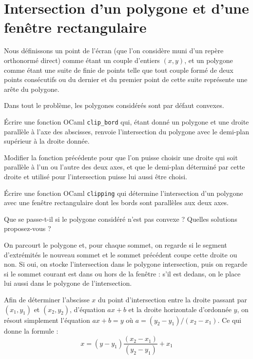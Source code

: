 \renewcommand{\SourceFile}{6-geometrie-et-images/src/6-5.ml}

\section[Intersection d'un polygone et d'une fenêtre rectangulaire]{Intersection d'un polygone et d'une\\ fenêtre rectangulaire}

Nous définissons un point de l'écran (que l'on considère muni d'un repère orthonormé direct) comme étant un couple d'entiers $(x,y)$, et un polygone comme étant une suite de finie de points telle que tout couple formé de deux points consécutifs ou du dernier et du premier point de cette suite représente une arête du polygone.
\medskip

Dans tout le problème, les polygones considérés sont par défaut convexes.

\Q
Écrire une fonction OCaml \texttt{clip\_bord} qui, étant donné un polygone et une droite parallèle à l'axe des abscisses, renvoie l'intersection du polygone avec le demi-plan supérieur à la droite donnée.

\Q
Modifier la fonction précédente pour que l'on puisse choisir une droite qui soit parallèle à l'un ou l'autre des deux axes, et que le demi-plan déterminé par cette droite et utilisé pour l'intersection puisse lui aussi être choisi.

\Q
Écrire une fonction OCaml \texttt{clipping} qui détermine l'intersection d'un polygone avec une fenêtre rectangulaire dont les bords sont parallèles aux deux axes.

\Q
Que se passe-t-il si le polygone considéré n'est pas convexe ? Quelles solutions proposez-vous ?

\Corrige

\Q
On parcourt le polygone et, pour chaque sommet, on regarde si le segment d'extrémités le nouveau sommet et le sommet précédent coupe cette droite ou non. Si oui, on stocke l'intersection dans le polygone intersection, puis on regarde si le sommet courant est dans ou hors de la fenêtre : s'il est dedans, on le place lui aussi dans le polygone de l'intersection.
\medskip

Afin de déterminer l'abscisse $x$ du point d'intersection entre la droite passant par $(x_1,y_1)$ et $(x_2,y_2)$, d'équation $ax+b$ et la droite horizontale d'ordonnée $y$, on résout simplement l'équation $ax+b=y$ où $a=(y_2-y_1)/(x_2-x_1)$. Ce qui donne la formule :
\[
    x = (y-y_1)\frac{(x_2-x_1)}{(y_2-y_1)} + x_1
\]

